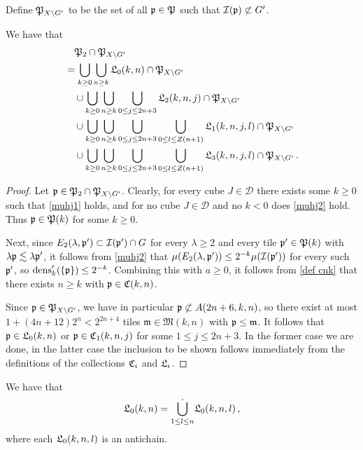 {Define $\mathfrak P_{X \setminus G'}$ to be the set of all $\mathfrak p \in \mathfrak P$ such that $\mathcal{I}(\mathfrak p) \not \subset G'$.
\begin{lemma}
\label{antichain decomposition}
    We have that
    \begin{align}
        \label{eq fp' decomposition}
        &\quad \mathfrak P_2 \cap \mathfrak P_{X \setminus G'}\\
        &=  \bigcup_{k \ge 0} \bigcup_{n \ge k} \mathfrak L_0(k,n) \cap \mathfrak P_{X \setminus G'} \\
        &\quad\cup \bigcup_{k \ge 0} \bigcup_{n \ge k}\bigcup_{0 \le j \le 2n+3} \mathfrak L_2(k,n,j) \cap \mathfrak P_{X \setminus G'}\\
        &\quad\cup  \bigcup_{k \ge 0} \bigcup_{n \ge k}\bigcup_{0 \le j \le 2n+3} \bigcup_{0 \le l \le Z(n+1)} \mathfrak L_1(k,n,j,l) \cap \mathfrak P_{X \setminus G'}\\
        &\quad\cup  \bigcup_{k \ge 0} \bigcup_{n \ge k}\bigcup_{0 \le j \le 2n+3} \bigcup_{0 \le l \le Z(n+1)}  \mathfrak L_3(k,n,j,l)\cap \mathfrak P_{X \setminus G'}\,.
    \end{align}
\end{lemma}

\begin{proof}
    Let $\mathfrak p \in \mathfrak P_2 \cap \mathfrak P_{X \setminus G'}$. Clearly, for every cube $J \in \mathcal{D}$ there exists some $k \ge 0$ such that \eqref{muhj1} holds, and for no cube $J \in \mathcal{D}$ and no $k < 0$ does \eqref{muhj2} hold. Thus $\mathfrak p \in \mathfrak P(k)$ for some $k \ge 0$.

    Next, since $E_2(\lambda, \mathfrak p') \subset \mathcal{I}(\mathfrak p')\cap G$ for every $\lambda \ge 2$ and every tile $\mathfrak p' \in \mathfrak P(k)$ with $\lambda\mathfrak p \lesssim \lambda \mathfrak p'$, it follows from \eqref{muhj2} that $\mu(E_2(\lambda, \mathfrak p')) \le 2^{-k} \mu(\mathcal{I}(\mathfrak p'))$ for every such $\mathfrak p'$, so $\operatorname{\operatorname{dens}}_k'(\{\mathfrak p\}) \le 2^{-k}$. Combining this with $a \ge 0$, it follows from \eqref{def cnk} that there exists $n\ge k$ with $\mathfrak p \in \mathfrak C(k,n)$.

    Since $\mathfrak p \in \mathfrak P_{X \setminus G'}$, we have in particular $\mathfrak p \not \subset A(2n + 6, k, n)$, so there exist at most $1 + (4n + 12)2^n < 2^{2n+4}$ tiles $\mathfrak{m} \in \mathfrak{M}(k,n)$ with $\mathfrak p \le \mathfrak{m}$. It follows that $\mathfrak p \in \mathfrak L_0(k,n)$ or $\mathfrak p \in \mathfrak C_1(k,n,j)$ for some $1 \le j \le 2n + 3$. In the former case we are done, in the latter case the inclusion to be shown follows immediately from the definitions of the collections $\mathfrak C_i$ and $\mathfrak L_i$.
\end{proof}

\begin{lemma}
\label{L0 antichain}
    We have that
    $$
        \mathfrak L_0(k,n) = \dot{\bigcup_{1 \le l \le n}} \mathfrak L_0(k,n,l)\,,
    $$
    where each $\mathfrak L_0(k,n,l)$ is an antichain.
\end{lemma}

}
